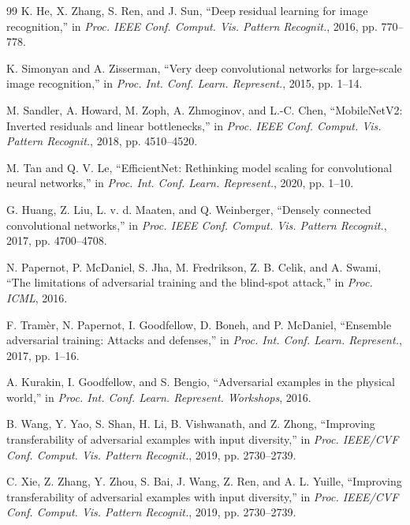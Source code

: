 \documentclass[10pt,conference]{IEEEtran}
\begin{document}
\begin{thebibliography}{99}
 K. He, X. Zhang, S. Ren, and J. Sun, ``Deep residual learning for image recognition,'' in \textit{Proc. IEEE Conf. Comput. Vis. Pattern Recognit.}, 2016, pp. 770--778.

 K. Simonyan and A. Zisserman, ``Very deep convolutional networks for large-scale image recognition,'' in \textit{Proc. Int. Conf. Learn. Represent.}, 2015, pp. 1--14.

 M. Sandler, A. Howard, M. Zoph, A. Zhmoginov, and L.-C. Chen, ``MobileNetV2: Inverted residuals and linear bottlenecks,'' in \textit{Proc. IEEE Conf. Comput. Vis. Pattern Recognit.}, 2018, pp. 4510--4520.

 M. Tan and Q. V. Le, ``EfficientNet: Rethinking model scaling for convolutional neural networks,'' in \textit{Proc. Int. Conf. Learn. Represent.}, 2020, pp. 1--10.

 G. Huang, Z. Liu, L. v. d. Maaten, and Q. Weinberger, ``Densely connected convolutional networks,'' in \textit{Proc. IEEE Conf. Comput. Vis. Pattern Recognit.}, 2017, pp. 4700--4708.

 N. Papernot, P. McDaniel, S. Jha, M. Fredrikson, Z. B. Celik, and A. Swami, ``The limitations of adversarial training and the blind-spot attack,'' in \textit{Proc. ICML}, 2016.

 F. Tramèr, N. Papernot, I. Goodfellow, D. Boneh, and P. McDaniel, ``Ensemble adversarial training: Attacks and defenses,'' in \textit{Proc. Int. Conf. Learn. Represent.}, 2017, pp. 1--16.

 A. Kurakin, I. Goodfellow, and S. Bengio, ``Adversarial examples in the physical world,'' in \textit{Proc. Int. Conf. Learn. Represent. Workshops}, 2016.

 B. Wang, Y. Yao, S. Shan, H. Li, B. Vishwanath, and Z. Zhong, ``Improving transferability of adversarial examples with input diversity,'' in \textit{Proc. IEEE/CVF Conf. Comput. Vis. Pattern Recognit.}, 2019, pp. 2730--2739.

 C. Xie, Z. Zhang, Y. Zhou, S. Bai, J. Wang, Z. Ren, and A. L. Yuille, ``Improving transferability of adversarial examples with input diversity,'' in \textit{Proc. IEEE/CVF Conf. Comput. Vis. Pattern Recognit.}, 2019, pp. 2730--2739.

\end{thebibliography}
\end{document}
